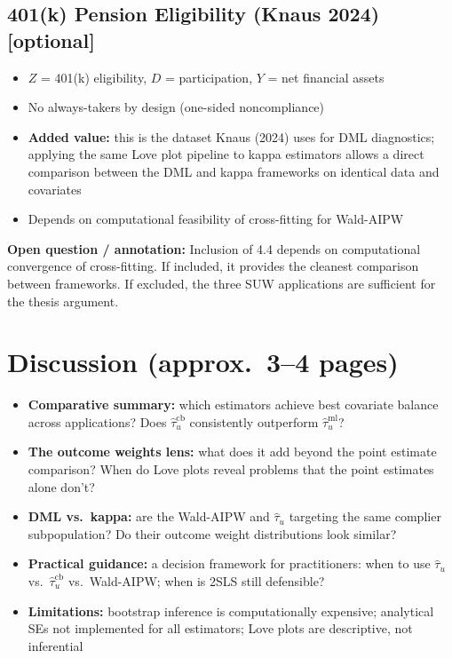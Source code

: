 \documentclass[12pt, a4paper]{article}
\newenvironment{openbox}{%
  \begin{mdframed}[backgroundcolor=greenbg,linecolor=notegreen,linewidth=1pt]%
  \textbf{\color{notegreen}Open question / annotation:} }{%
  \end{mdframed}}
\begin{document}
\subsection{401(k) Pension Eligibility \textnormal{(Knaus 2024)} \textnormal{[optional]}}

\begin{itemize}
  \item $Z$ = 401(k) eligibility, $D$ = participation, $Y$ = net financial assets
  \item No always-takers by design (one-sided noncompliance)
  \item \textbf{Added value:} this is the dataset Knaus (2024) uses for DML diagnostics; applying the same Love plot pipeline to kappa estimators allows a direct comparison between the DML and kappa frameworks on identical data and covariates
  \item Depends on computational feasibility of cross-fitting for Wald-AIPW
\end{itemize}

\begin{openbox}
Inclusion of 4.4 depends on computational convergence of cross-fitting. If included, it provides the cleanest comparison between frameworks. If excluded, the three SUW applications are sufficient for the thesis argument.
\end{openbox}

\section{Discussion \textnormal{\small(approx.\ 3--4 pages)}}

\begin{itemize}
  \item \textbf{Comparative summary:} which estimators achieve best covariate balance across applications? Does $\hat\tau_u^{\text{cb}}$ consistently outperform $\hat\tau_u^{\text{ml}}$?
  \item \textbf{The outcome weights lens:} what does it add beyond the point estimate comparison? When do Love plots reveal problems that the point estimates alone don't?
  \item \textbf{DML vs.\ kappa:} are the Wald-AIPW and $\hat\tau_u$ targeting the same complier subpopulation? Do their outcome weight distributions look similar?
  \item \textbf{Practical guidance:} a decision framework for practitioners: when to use $\hat\tau_u$ vs.\ $\hat\tau_u^{\text{cb}}$ vs.\ Wald-AIPW; when is 2SLS still defensible?
  \item \textbf{Limitations:} bootstrap inference is computationally expensive; analytical SEs not implemented for all estimators; Love plots are descriptive, not inferential
\end{itemize}
\end{document}
